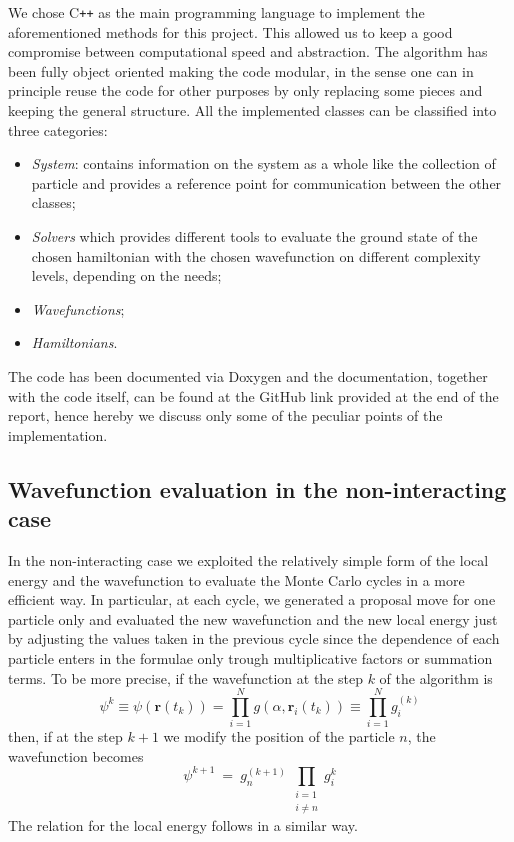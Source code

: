 We chose C\texttt{++} as the main programming language to implement the aforementioned methods for this project. This allowed us to keep a good compromise between computational speed and abstraction. The algorithm has been fully object oriented making the code modular, in the sense one can in principle reuse the code for other purposes by only replacing some pieces and keeping the general structure. All the implemented classes can be classified into three categories:
\begin{itemize}
    \item \emph{System}: contains information on the system as a whole like the collection of particle and provides a reference point for communication between the other classes;
    \item \emph{Solvers} which provides different tools to evaluate the ground state of the chosen hamiltonian with the chosen wavefunction on different complexity levels, depending on the needs;
    \item \emph{Wavefunctions};
    \item \emph{Hamiltonians}.
\end{itemize}
The code has been documented via Doxygen and the documentation, together with the code itself, can be found at the GitHub link provided at the end of the report, hence hereby we discuss only some of the peculiar points of the implementation.
\subsection*{Wavefunction evaluation in the non-interacting case}
In the non-interacting case we exploited the relatively simple form of the local energy and the wavefunction to evaluate the Monte Carlo cycles in a more efficient way. In particular, at each cycle, we generated a proposal move for one particle only and evaluated the new wavefunction and the new local energy just by adjusting the values taken in the previous cycle since the dependence of each particle enters in the formulae only trough multiplicative factors or summation terms. To be more precise, if the wavefunction at the step $k$ of the algorithm is
$$\psi^{k} \equiv \psi(\bm{r}(t_k)) = \prod_{i=1}^{N} g(\alpha, \bm{r}_i(t_k)) \equiv \prod_{i=1}^N g_i^{(k)}$$
then, if at the step $k+1$ we modify the position of the particle $n$, the wavefunction becomes
$$\psi^{k+1} \ = \ g_n^{(k+1)} \, \prod_{\substack{i=1\\ i \neq n}} g_i^{k}$$
The relation for the local energy follows in a similar way.
